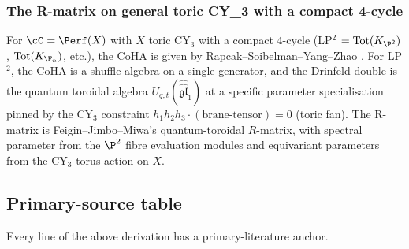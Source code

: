 \subsubsection*{The R-matrix on general toric CY_3 with a compact 4-cycle}

For $\cC = \Perf(X)$ with $X$ toric CY$_3$ with a compact $4$-cycle
(LP$^2$ $= \mathrm{Tot}(K_{\P^2})$, $\mathrm{Tot}(K_{\F_n})$, etc.),
the CoHA is given by Rapcak--Soibelman--Yang--Zhao \cite{RSYZ}.  For
LP$^2$, the CoHA is a shuffle algebra on a single generator, and the
Drinfeld double is the quantum toroidal algebra
$U_{q, t}(\widehat{\widehat{\mathfrak{gl}}}_1)$ at a specific
parameter specialisation pinned by the CY$_3$ constraint $h_1 h_2 h_3
\cdot (\text{brane-tensor}) = 0$ (toric fan).  The R-matrix is
Feigin--Jimbo--Miwa's quantum-toroidal $R$-matrix, with spectral
parameter from the $\P^2$ fibre evaluation modules and equivariant
parameters from the CY$_3$ torus action on $X$.


\subsection*{Primary-source table}

Every line of the above derivation has a primary-literature anchor.

